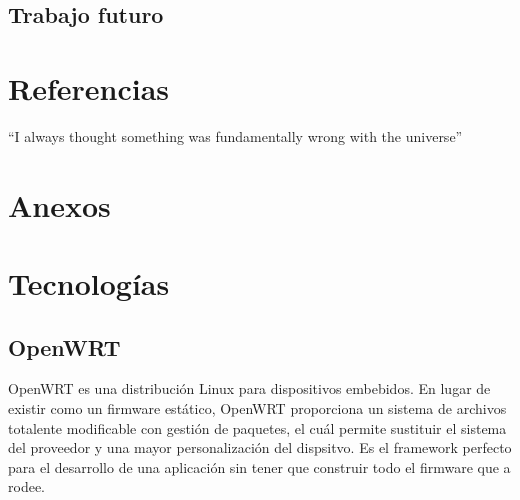 \documentclass{article}
\begin{document}


    \subsection{Trabajo futuro}


\section{Referencias}
``I always thought something was fundamentally wrong with the universe'' \citep{adams1995hitchhiker}











\section{Anexos}



\section{Tecnologías}
    \subsection{OpenWRT}
    OpenWRT es una distribución Linux para dispositivos embebidos. En lugar de existir como un firmware estático, OpenWRT proporciona un sistema de archivos totalente modificable con gestión de paquetes, el cuál permite sustituir el sistema del proveedor y una mayor personalización del dispsitvo. Es el framework perfecto para el desarrollo de una aplicación sin tener que construir todo el firmware que a rodee. 
\end{document}
